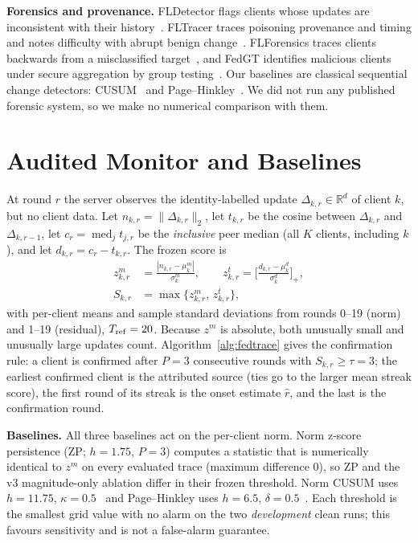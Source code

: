 \documentclass{article}
\begin{document}
\textbf{Forensics and provenance.} FLDetector flags clients whose updates are inconsistent with their history~\cite{zhang2022fldetector}. FLTracer traces poisoning provenance and timing and notes difficulty with abrupt benign change~\cite{zhang2024fltracer}. FLForensics traces clients backwards from a misclassified target~\cite{jia2025flforensics}, and FedGT identifies malicious clients under secure aggregation by group testing~\cite{xhemrishi2025fedgt}. Our baselines are classical sequential change detectors: CUSUM~\cite{page1954cusum} and Page--Hinkley~\cite{hinkley1971change}. We did not run any published forensic system, so we make no numerical comparison with them.

\section{Audited Monitor and Baselines}
\label{sec:monitor}

At round $r$ the server observes the identity-labelled update $\Delta_{k,r}\in\mathbb{R}^d$ of client $k$, but no client data. Let $n_{k,r}=\|\Delta_{k,r}\|_2$, let $t_{k,r}$ be the cosine between $\Delta_{k,r}$ and $\Delta_{k,r-1}$, let $c_r=\operatorname{med}_j t_{j,r}$ be the \emph{inclusive} peer median (all $K$ clients, including $k$), and let $d_{k,r}=c_r-t_{k,r}$. The frozen score is
\begin{align}
z^m_{k,r}&=\frac{|n_{k,r}-\mu^m_k|}{\sigma^m_k},\qquad
z^t_{k,r}=\Big[\frac{d_{k,r}-\mu^d_k}{\sigma^d_k}\Big]_+,\nonumber\\
S_{k,r}&=\max\{z^m_{k,r},\,z^t_{k,r}\},
\label{eq:monitor}
\end{align}
with per-client means and sample standard deviations from rounds 0--19 (norm) and 1--19 (residual), $T_{\rm ref}=20$. Because $z^m$ is absolute, both unusually small and unusually large updates count. Algorithm~\ref{alg:fedtrace} gives the confirmation rule: a client is confirmed after $P=3$ consecutive rounds with $S_{k,r}\ge\tau=3$; the earliest confirmed client is the attributed source (ties go to the larger mean streak score), the first round of its streak is the onset estimate $\hat r$, and the last is the confirmation round.



\textbf{Baselines.} All three baselines act on the per-client norm. Norm z-score persistence (ZP; $h=1.75$, $P=3$) computes a statistic that is numerically identical to $z^m$ on every evaluated trace (maximum difference 0), so ZP and the v3 magnitude-only ablation differ in their frozen threshold. Norm CUSUM uses $h=11.75$, $\kappa=0.5$~\cite{page1954cusum} and Page--Hinkley uses $h=6.5$, $\delta=0.5$~\cite{hinkley1971change}. Each threshold is the smallest grid value with no alarm on the two \emph{development} clean runs; this favours sensitivity and is not a false-alarm guarantee.
\end{document}
